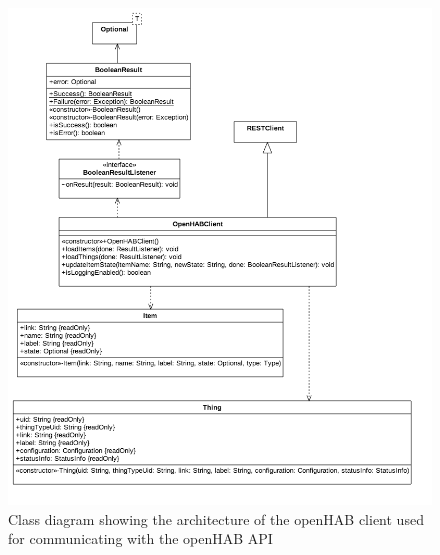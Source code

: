 \begin{figure}[h!]
\centering
\includegraphics[width=\textwidth]{images/uml-openhab-client}
\caption{Class diagram showing the architecture of the openHAB client used for communicating with the openHAB API}
\label{fig:design:communication-with-openhab:class-diagram-openhab-client}
\end{figure}

